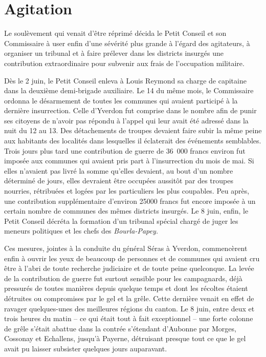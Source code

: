 \documentclass[french,twoside]{book} %
\begin{document}
\section[Agitation]{Agitation}
\noindent Le soulèvement qui venait d’être réprimé décida le Petit Conseil et son Commissaire à user enfin d’une sévérité plus grande à l’égard des agitateurs, à organiser un tribunal et à faire prélever dans les districts insurgés une contribution extraordinaire pour subvenir aux frais de l’occupation militaire.\par
Dès le 2 juin, le Petit Conseil enleva à Louis Reymond sa charge de capitaine dans la deuxième demi-brigade auxiliaire. Le 14 du même mois, le Commissaire ordonna le désarmement de toutes les communes qui avaient participé à la dernière insurrection. Celle d’Yverdon fut comprise dans le nombre afin de punir ses citoyens de n’avoir pas répondu à l’appel qui leur avait été adressé dans la nuit du 12 au 13. Des détachements de troupes devaient faire subir la même peine aux habitants des localités dans lesquelles il éclaterait des événements semblables. Trois jours plus tard une contribution de guerre de 36 000 francs environ fut imposée aux communes qui avaient pris part à l’insurrection du mois de mai. Si elles n’avaient pas livré la somme qu’elles devaient, au bout d’un nombre déterminé de jours, elles devraient être occupées aussitôt par des troupes nourries, rétribuées et logées par les particuliers les plus coupables. Peu après, une contribution supplémentaire d’environ 25000 francs fut encore imposée à un certain nombre de communes des mêmes districts insurgés. Le 8 juin, enfin, le Petit Conseil décréta la formation d’un tribunal spécial chargé de juger les meneurs politiques et les chefs des \emph{Bourla-Papey.}\par
Ces mesures, jointes à la conduite du général Séras à Yverdon, commencèrent enfin à ouvrir les yeux de beaucoup de personnes et de communes qui avaient cru être à l’abri de toute recherche judiciaire et de toute peine quelconque. La levée de la contribution de guerre fut surtout sensible pour les campagnards, déjà pressurés de toutes manières depuis quelque temps et dont les récoltes étaient détruites ou compromises par le gel et la grêle. Cette dernière venait en effet de ravager quelques-unes des meilleures régions du canton. Le 8 juin, entre deux et trois heures du matin – ce qui était tout à fait exceptionnel – une forte colonne de grêle s’était abattue dans la contrée s’étendant d’Aubonne par Morges, Cossonay et Echallens, jusqu’à Payerne, détruisant presque tout ce que le gel avait pu laisser subsister quelques jours auparavant.\par
\end{document}
